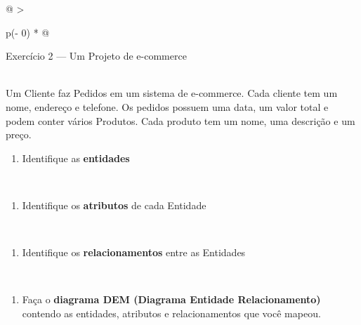 \documentclass[
]{book}
\providecommand{\tightlist}{%
  \setlength{\itemsep}{0pt}\setlength{\parskip}{0pt}}
\begin{document}
\begin{longtable}[]{@{}
  >{\raggedright\arraybackslash}p{(\columnwidth - 0\tabcolsep) * }@{}}
\toprule\noalign{}
\begin{minipage}[b]{\linewidth}\raggedright
Exercício 2 --- Um Projeto de e-commerce
\end{minipage} \\
\midrule\noalign{}
\endhead
\bottomrule\noalign{}
\endlastfoot
Um Cliente faz Pedidos em um sistema de e-commerce. Cada cliente tem um nome, endereço e telefone. Os pedidos possuem uma data, um valor total e podem conter vários Produtos. Cada produto tem um nome, uma descrição e um preço. \\
\begin{minipage}[t]{\linewidth}\raggedright
\begin{enumerate}
\def\labelenumi{\alph{enumi})}
\tightlist
\item
  Identifique as \textbf{entidades}
\end{enumerate}
\end{minipage} \\
\begin{minipage}[t]{\linewidth}\raggedright
\begin{enumerate}
\def\labelenumi{\alph{enumi})}
\setcounter{enumi}{1}
\tightlist
\item
  Identifique os \textbf{atributos} de cada Entidade
\end{enumerate}
\end{minipage} \\
\begin{minipage}[t]{\linewidth}\raggedright
\begin{enumerate}
\def\labelenumi{\alph{enumi})}
\setcounter{enumi}{2}
\tightlist
\item
  Identifique os \textbf{relacionamentos} entre as Entidades
\end{enumerate}
\end{minipage} \\
\begin{minipage}[t]{\linewidth}\raggedright
\begin{enumerate}
\def\labelenumi{\alph{enumi})}
\setcounter{enumi}{4}
\tightlist
\item
  Faça o \textbf{diagrama DEM (Diagrama Entidade Relacionamento)} contendo as entidades, atributos e relacionamentos que você mapeou.
\end{enumerate}
\end{minipage} \\
\end{longtable}
\end{document}
